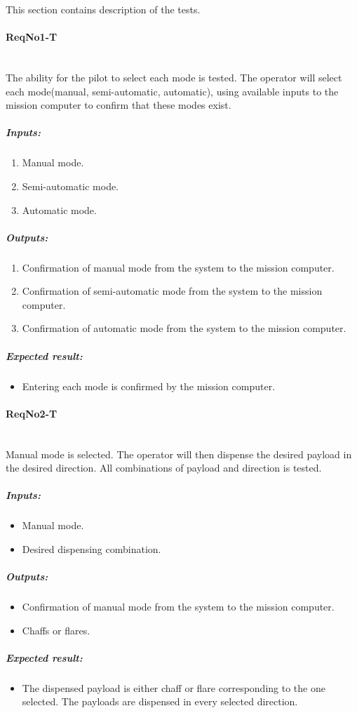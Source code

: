 This section contains description of the tests.

\paragraph{ReqNo1-T}\mbox{}\\ %
The ability for the pilot to select each mode is tested. The operator will select each mode(manual, semi-automatic, automatic), using available inputs to the mission computer to confirm that these modes exist.

\subparagraph{Inputs:}
	\begin{enumerate}
	\item Manual mode.
	\item Semi-automatic mode.
	\item Automatic mode.
	\end{enumerate}
	\subparagraph{Outputs:}
	\begin{enumerate}
	\item Confirmation of manual mode from the system to the mission computer.
	\item Confirmation of semi-automatic mode from the system to the mission computer.
	\item Confirmation of automatic mode from the system to the mission computer.
	\end{enumerate}
	\subparagraph{Expected result:}
	\begin{itemize}
	\item Entering each mode is confirmed by the mission computer.
	\end{itemize}

\paragraph{ReqNo2-T}\mbox{}\\ %
Manual mode is selected. The operator will then dispense the desired payload in the desired direction. All combinations of payload and direction is tested.
\\
	\subparagraph{Inputs:}
	\begin{itemize}
	\item Manual mode.
	\item Desired dispensing combination.
	\end{itemize}
	\subparagraph{Outputs:}
	\begin{itemize}
	\item Confirmation of manual mode from the system to the mission computer.
	\item Chaffs or flares.
	\end{itemize}
	\subparagraph{Expected result:}
	\begin{itemize}
	\item The dispensed payload is either chaff or flare corresponding to the one selected. The payloads are dispensed in every selected direction.
	\end{itemize}

